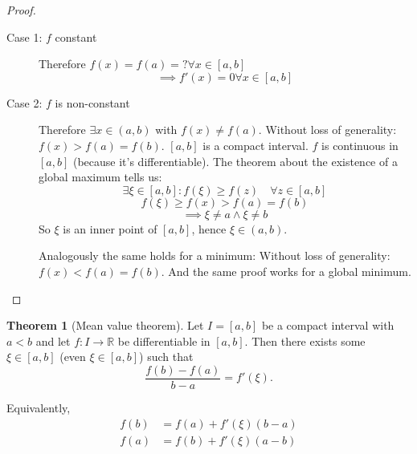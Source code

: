 \documentclass[a4paper,landscape,twocolumn]{article}
\theoremstyle{definition}
\newtheorem{theorem}{Theorem}
\begin{document}
\begin{proof}
  \begin{description}
    \item[Case 1: $f$ constant]
      Therefore $f(x) = f(a) = ? \forall x \in [a,b]$
      \[ \implies f'(x) = 0 \forall x \in [a,b] \]
    \item[Case 2: $f$ is non-constant]
      Therefore $\exists x \in (a, b)$ with $f(x) \neq f(a)$.
      Without loss of generality: $f(x) > f(a) = f(b)$.
      $[a,b]$ is a compact interval. $f$ is continuous in $[a,b]$
      (because it's differentiable). The theorem about the
      existence of a global maximum tells us:
      \[ \exists \xi \in [a,b]: f(\xi) \geq f(z) \quad\forall z \in [a,b] \]
      \[ f(\xi) \geq f(x) > f(a) = f(b) \]
      \[ \implies \xi \neq a \land \xi \neq b \]
      So $\xi$ is an inner point of $[a,b]$, hence $\xi \in (a,b)$.

      Analogously the same holds for a minimum:
      Without loss of generality: $f(x) < f(a) = f(b)$.
      And the same proof works for a global minimum.
  \end{description}
\end{proof}
%
\begin{theorem}[Mean value theorem]
  Let $I = [a,b]$ be a compact interval with $a<b$ and let $f: I \to \mathbb R$
  be differentiable in $[a,b]$. Then there exists some $\xi \in [a,b]$
  (even $\xi \in [a,b]$) such that
  \[ \frac{f(b) - f(a)}{b - a} = f'(\xi). \]

  Equivalently,
  \begin{align*}
    f(b) &= f(a) + f'(\xi)(b - a) \\
    f(a) &= f(b) + f'(\xi)(a - b)
  \end{align*}
\end{theorem}
%
\end{document}

